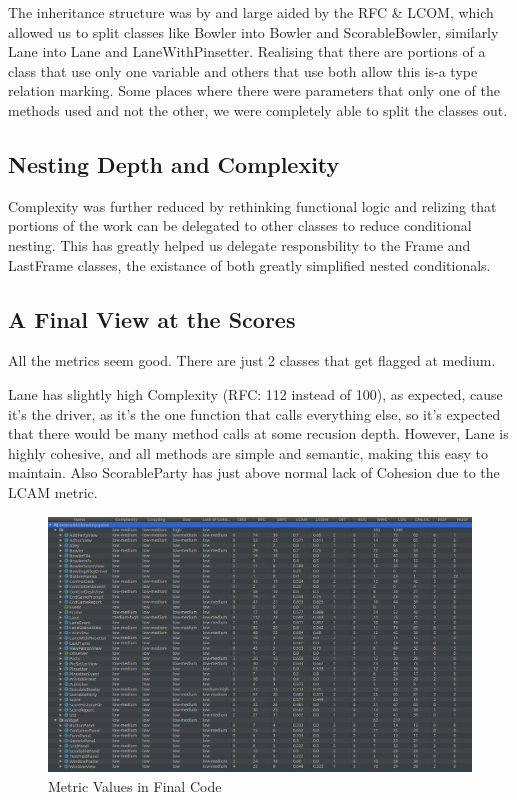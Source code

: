 The inheritance structure was by and large aided by the RFC & LCOM, which allowed us to split classes like Bowler into Bowler and ScorableBowler, similarly Lane into Lane and LaneWithPinsetter. Realising that there are portions of a class that use only one variable and others that use both allow this is-a type relation marking. Some places where there were parameters that only one of the methods used and not the other, we were completely able to split the classes out.

\subsection{Nesting Depth and Complexity}

Complexity was further reduced by rethinking functional logic and relizing that portions of the work can be delegated to other classes to reduce conditional nesting. This has greatly helped us delegate responsbility to the Frame and LastFrame classes, the existance of both greatly simplified nested conditionals.


\subsection{A Final View at the Scores}

All the metrics seem good. There are just 2 classes that get flagged at medium.

Lane has slightly high Complexity (RFC: 112 instead of 100), as expected, cause it's the driver, as it's the one function that calls everything else, so it's expected that there would be many method calls at some recusion depth. However, Lane is highly cohesive, and all methods are simple and semantic, making this easy to maintain. Also ScorableParty has just above normal lack of Cohesion due to the LCAM metric.

\begin{figure}[H]
    \centering
    \includegraphics[width = \textwidth]{img/metric_values.png}
    \caption{Metric Values in Final Code}
\end{figure}
